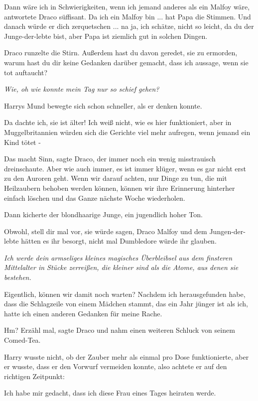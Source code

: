 \glqq{}Dann wäre ich in Schwierigkeiten, wenn ich jemand anderes als ein Malfoy
wäre\grqq{}, antwortete Draco süffisant. \glqq{}Da ich ein Malfoy bin ... hat
Papa die Stimmen. Und danach würde er dich zerquetschen ... na ja, ich schätze,
nicht so leicht, da du der Junge-der-lebte bist, aber Papa ist ziemlich gut in
solchen Dingen.\grqq{}

Draco runzelte die Stirn. \glqq{}Außerdem hast du davon geredet, sie zu
ermorden, warum hast du dir keine Gedanken darüber gemacht, dass ich aussage,
wenn sie tot auftaucht?\grqq{}

\emph{Wie, oh wie konnte mein Tag nur so schief gehen?}

Harrys Mund bewegte sich schon schneller, als er denken konnte.

\glqq{}Da dachte ich, sie ist älter! Ich weiß nicht, wie es hier funktioniert,
aber in Muggelbritannien würden sich die Gerichte viel mehr aufregen, wenn
jemand ein Kind tötet -\grqq{}

\glqq{}Das macht Sinn\grqq{}, sagte Draco, der immer noch ein wenig misstrauisch
dreinschaute. \glqq{}Aber wie auch immer, es ist immer klüger, wenn es gar nicht
erst zu den Auroren geht. Wenn wir darauf achten, nur Dinge zu tun, die mit
Heilzaubern behoben werden können, können wir ihre Erinnerung hinterher einfach
löschen und das Ganze nächste Woche wiederholen.\grqq{}

Dann kicherte der blondhaarige Junge, ein jugendlich hoher Ton.

\glqq{}Obwohl, stell dir mal vor, sie würde sagen, Draco Malfoy und dem
Jungen-der-lebte hätten es ihr besorgt, nicht mal Dumbledore würde ihr
glauben.\grqq{}

\emph{Ich werde dein armseliges kleines magisches Überbleibsel aus dem finsteren
Mittelalter in Stücke zerreißen, die kleiner sind als die Atome, aus denen sie
bestehen.}

\glqq{}Eigentlich, können wir damit noch warten? Nachdem ich herausgefunden
habe, dass die Schlagzeile von einem Mädchen stammt, das ein Jahr jünger ist als
ich, hatte ich einen anderen Gedanken für meine Rache.\grqq{}

\glqq{}Hm? Erzähl mal\grqq{}, sagte Draco und nahm einen weiteren Schluck von
seinem Comed-Tea.

Harry wusste nicht, ob der Zauber mehr als einmal pro Dose funktionierte, aber
er wusste, dass er den Vorwurf vermeiden konnte, also achtete er auf den
richtigen Zeitpunkt:

\glqq{}Ich habe mir gedacht, dass ich diese Frau eines Tages heiraten
werde.\grqq{}

